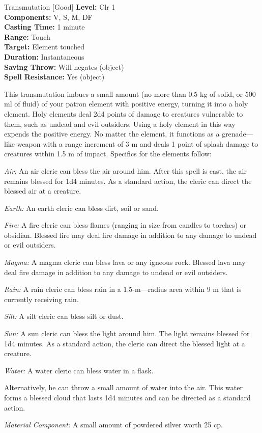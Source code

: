 {Transmutation [Good]}
{
	\textbf{Level:}
	Clr 1\\
	\textbf{Components:}
	V, S, M, DF\\
	\textbf{Casting Time:}
	1 minute\\
	\textbf{Range:}
	Touch\\
	\textbf{Target:}
	Element touched\\
	\textbf{Duration:}
	Instantaneous\\
	\textbf{Saving Throw:}
	Will negates (object)\\
	\textbf{Spell Resistance:}
	Yes (object)\\
}
{
	This transmutation imbues a small amount (no more than 0.5 kg of solid, or 500 ml of fluid) of your patron element with positive energy, turning it into a holy element. Holy elements deal 2d4 points of damage to creatures vulnerable to them, such as undead and evil outsiders. Using a holy element in this way expends the positive energy. No matter the element, it functions as a grenade---like weapon with a range increment of 3 m and deals 1 point of splash damage to creatures within 1.5 m of impact. Specifics for the elements follow:

	\textit{Air:} An air cleric can bless the air around him. After this spell is cast, the air remains blessed for 1d4 minutes. As a standard action, the cleric can direct the blessed air at a creature.

	\textit{Earth:} An earth cleric can bless dirt, soil or sand.

	\textit{Fire:} A fire cleric can bless flames (ranging in size from candles to torches) or obsidian. Blessed fire may deal fire damage in addition to any damage to undead or evil outsiders.

	\textit{Magma:} A magma cleric can bless lava or any igneous rock. Blessed lava may deal fire damage in addition to any damage to undead or evil outsiders.

	\textit{Rain:} A rain cleric can bless rain in a 1.5-m---radius area within 9 m that is currently receiving rain.

	\textit{Silt:} A silt cleric can bless silt or dust.

	\textit{Sun:} A sun cleric can bless the light around him. The light remains blessed for 1d4 minutes. As a standard action, the cleric can direct the blessed light at a creature.

	\textit{Water:} A water cleric can bless water in a flask.

	Alternatively, he can throw a small amount of water into the air. This water forms a blessed cloud that lasts 1d4 minutes and can be directed as a standard action.

	\textit{Material Component:} A small amount of powdered silver worth 25 cp.
}
